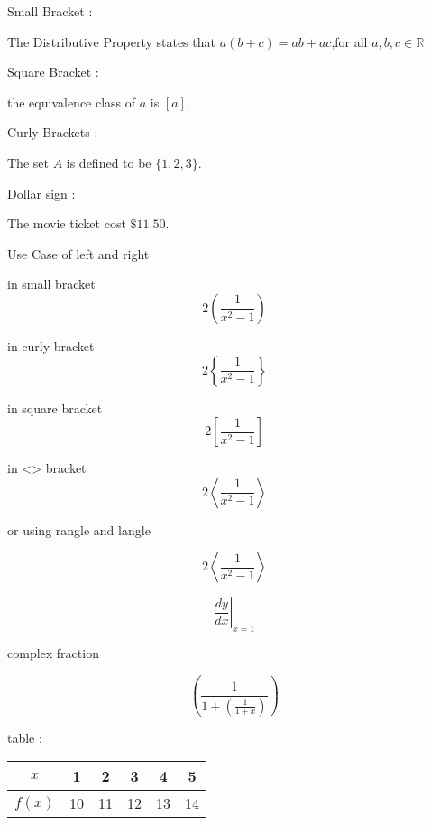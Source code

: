 \documentclass[18pt]{article}    %
\begin{document}
Small Bracket :

The Distributive Property states that $a(b+c)=ab+ac$,for all $a,b,c \in \mathbb{R}$    %

Square Bracket :

the equivalence class of $a$ is $[a]$.       %

Curly Brackets :

The set $A$ is defined to be $\{1,2,3\}$.    %

Dollar sign :

The movie ticket cost $\$11.50$.            %

Use Case of left and right

in small bracket
$$  2\left(\frac{1}{x^2-1}\right)  $$     %

in curly bracket
$$  2\left\{\frac{1}{x^2-1}\right\}  $$   %

in square bracket
$$ 2\left [\frac{1}{x^2-1}\right]  $$     %

in <> bracket 
$$  2\left<\frac{1}{x^2-1}\right>  $$     %

or using rangle and langle

$$  2\left \langle \frac{1}{x^2-1} \right \rangle    $$   %

$$  \left. \frac{dy}{dx} \right |_{x=1}  $$   %

complex fraction

$$ \left (\frac{1}{1 + \left(\frac{1}{1+x}\right)}\right)  $$   %

table : 

\begin{tabular}{|c||c|c|c|c|c|}    %
\hline
$x$ & 1 & 2 & 3 & 4 & 5 \\ \hline
$f(x)$ & 10 & 11 & 12 & 13 & 14 \\ \hline
\end{tabular}

\vspace{1cm}      %
\end{document}
